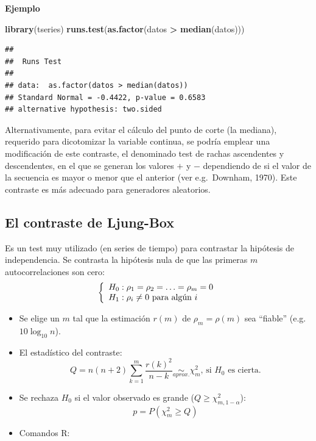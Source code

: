 \documentclass[
]{book}
\newenvironment{Shaded}{\begin{snugshade}}{\end{snugshade}}
\newcommand{\KeywordTok}[1]{\textcolor[rgb]{0.13,0.29,0.53}{\textbf{#1}}}
\newcommand{\NormalTok}[1]{#1}
\newcommand{\OperatorTok}[1]{\textcolor[rgb]{0.81,0.36,0.00}{\textbf{#1}}}
\newcommand{\StringTok}[1]{\textcolor[rgb]{0.31,0.60,0.02}{#1}}
\theoremstyle{break}
\theoremstyle{definition}
\theoremstyle{definition}
\theoremstyle{definition}
\theoremstyle{remark}
\begin{document}
\textbf{Ejemplo}

\begin{Shaded}
\begin{Highlighting}[]
\KeywordTok{library}\NormalTok{(tseries)}
\KeywordTok{runs.test}\NormalTok{(}\KeywordTok{as.factor}\NormalTok{(datos }\OperatorTok{>}\StringTok{ }\KeywordTok{median}\NormalTok{(datos)))}
\end{Highlighting}
\end{Shaded}

\begin{verbatim}
## 
##  Runs Test
## 
## data:  as.factor(datos > median(datos))
## Standard Normal = -0.4422, p-value = 0.6583
## alternative hypothesis: two.sided
\end{verbatim}

Alternativamente, para evitar el cálculo del punto de corte (la mediana), requerido para dicotomizar la variable continua, se podría emplear una modificación de este contraste, el denominado test de rachas ascendentes y descendentes, en el que se generan los valores \(+\) y \(-\) dependiendo de si el valor de la secuencia es mayor o menor que el anterior (ver e.g.~Downham, 1970). Este contraste es más adecuado para generadores aleatorios.

\hypertarget{el-contraste-de-ljung-box}{%
\subsection{El contraste de Ljung-Box}\label{el-contraste-de-ljung-box}}

Es un test muy utilizado (en series de tiempo) para contrastar la
hipótesis de independencia.
Se contrasta la hipótesis nula de que las primeras \(m\)
autocorrelaciones son cero:
\[\left\{\begin{array}[c]{l}
    H_{0}:\rho_{1}=\rho_{2}=\ldots=\rho_{m}=0\\
    H_{1}:\rho_{i}\neq0\text{ para algún } i
\end{array}
\right.\]

\begin{itemize}
\item
  Se elige un \(m\) tal que la estimación \(r(m)\) de
  \(\rho_{m}=\rho(m)\) sea ``fiable'' (e.g.~\(10\log_{10}n\)).
\item
  El estadístico del contraste:
  \[Q=n(n+2)\sum_{k=1}^{m}\frac{r(k)^{2}}{n-k}\underset{aprox.}{\sim}\chi
  _{m}^{2}\text{, si }H_{0}\text{ es cierta.}\]
\item
  Se rechaza \(H_{0}\) si el valor observado es grande (\(Q\geq \chi_{m,1-\alpha}^{2}\)):
  \[p=P\left(  {\chi_{m}^{2}}\geq Q\right)\]
\item
  Comandos R:
\end{itemize}
\end{document}
